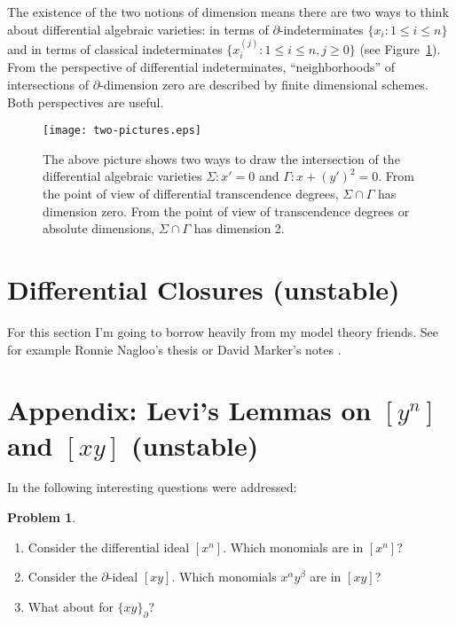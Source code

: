 \documentclass[12pt]{book}
\numberwithin{equation}{section}
\theoremstyle{definition}
\newtheorem{problem}[theorem]{Problem}
\theoremstyle{remark}
\begin{document}
The existence of the two notions of dimension means there are two ways to think about differential algebraic varieties: in terms of  $\partial$-indeterminates $\lbrace x_i \colon 1\leq i \leq n \rbrace$ and in terms of classical indeterminates $\lbrace x_i^{(j)} \colon 1\leq i \leq n, j\geq 0 \rbrace$ (see Figure~\ref{F:two-pictures}).
From the perspective of differential indeterminates, ``neighborhoods'' of intersections of $\partial$-dimension zero are described by finite dimensional schemes.
Both perspectives are useful.

\begin{figure}[h]
	\begin{center}
		\texttt{[image: two-pictures.eps]}
	\end{center}
	\caption{The above picture shows two ways to draw the intersection of the differential algebraic varieties $\Sigma \colon x'=0$ and $\Gamma \colon x+(y')^2=0$. 
		From the point of view of differential transcendence degrees, $\Sigma \cap \Gamma$ has dimension zero. 
		From the point of view of transcendence degrees or absolute dimensions, $\Sigma\cap \Gamma$ has dimension 2.
	}\label{F:two-pictures}
\end{figure}





\section{Differential Closures (unstable) \label{S:univariate-differential-closures}}
For this section I'm going to borrow heavily from my model theory friends.
See for example Ronnie Nagloo's thesis or David Marker's notes \cite{Marker2000}.


\section{Appendix: Levi's Lemmas on $[y^n]$ and $[xy]$ (unstable)}\label{S:levi}

In \cite{Levi1942} the following interesting questions were addressed:
\begin{problem}
	\begin{enumerate}
		\item Consider the differential ideal $[x^n]$.
		Which monomials  are in $[x^n]$? 
		\item Consider the $\partial$-ideal $[xy]$. 
		Which monomials $x^{\alpha}y^{\beta}$ are in $[xy]$?
		\item What about for $\lbrace xy \rbrace_{\partial}$?
	\end{enumerate}
\end{problem}
\end{document}
